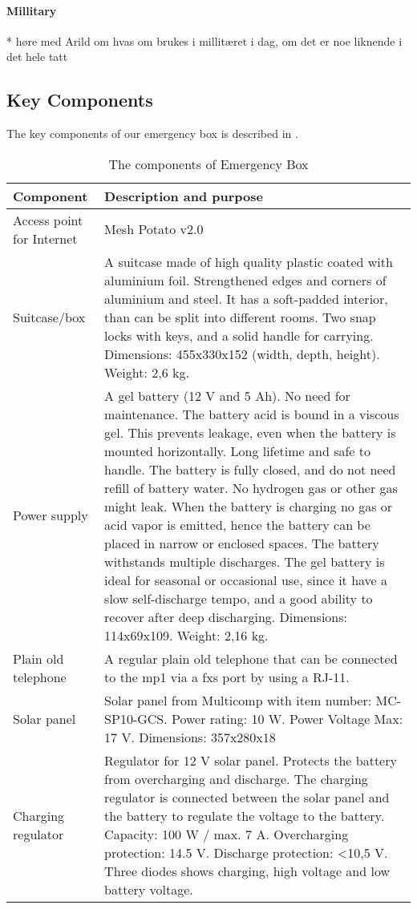 \paragraph{Millitary}
* høre med Arild om hvas om brukes i millitæret i dag, om det er noe liknende i det hele tatt

\subsection{Key Components}
The key components of our emergency box is described in . 

\begin{center}
\begin{table}[h!]
\caption{\label{tab:components}The components of Emergency Box}
    \begin{tabular}{ | l | p{9cm} |}
    \hline
    \textbf{Component} & \textbf{Description and purpose} \\ 
    \hline
    Access point for Internet &  Mesh Potato v2.0\\ 
    \hline
    Suitcase/box &  A suitcase made of high quality plastic coated with aluminium foil. Strengthened edges and corners of aluminium and steel. It has a soft-padded interior, than can be split into different rooms. Two snap locks with keys, and a solid handle for carrying. Dimensions: 455x330x152 (width, depth, height). Weight: 2,6 kg. \\ 
    \hline
    Power supply & A gel battery (12 V and 5 Ah). No need for maintenance. The battery acid is bound in a viscous gel. This prevents leakage, even when the battery is mounted horizontally. Long lifetime and safe to handle. The battery is fully closed, and do not need refill of battery water. No hydrogen gas or other gas might leak. When the battery is charging no gas or acid vapor is emitted, hence the battery can be placed in narrow or enclosed spaces. The battery withstands multiple discharges. The gel battery is ideal for seasonal or occasional use, since it have a slow self-discharge tempo, and a good ability to recover after deep discharging. Dimensions: 114x69x109. Weight: 2,16 kg. \\
    \hline
    Plain old telephone &  A regular plain old telephone that can be connected to the \gls{mp1} via a \gls{fxs} port by using a RJ-11. \\
	\hline
	Solar panel & Solar panel from Multicomp with item number: MC-SP10-GCS. Power rating: 10 W. Power Voltage Max: 17 V. Dimensions: 357x280x18\\
	\hline
	Charging regulator & Regulator for 12 V solar panel. Protects the battery from overcharging and discharge. The charging regulator is connected between the solar panel and the battery to regulate the voltage to the battery. Capacity: 100 W / max. 7 A. Overcharging protection: 14.5 V. Discharge protection: <10,5 V. Three diodes shows charging, high voltage and low battery voltage. \\
	\hline
    \end{tabular}
   \end{table}
\end{center}

